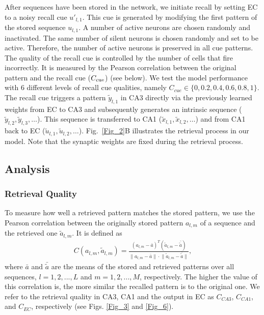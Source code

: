 \documentclass[utf8]{frontiersSCNS} %
\begin{document}
After sequences have been stored in the network, we initiate recall by setting EC to a noisy recall cue $u'_{l, 1}$. This cue is generated by modifying the first pattern of the stored sequence $u_{l, 1}$. A number of active neurons are chosen randomly and inactivated. The same number of silent neurons is chosen randomly and set to be active. 
%
Therefore, the number of active neurons is preserved in all cue patterns. 
%
The quality of the recall cue is controlled by the number of cells that fire incorrectly. It is measured by the Pearson correlation between the original pattern and the recall cue ($C_{\rm cue}$) (see below). We test the model performance with $6$ different levels of recall cue qualities, namely $ C_{cue} \in \{ 0, 0.2, 0.4, 0.6, 0.8, 1 \}$.
%
The recall cue triggers a pattern $\tilde{y}_{l, 1}$ in CA3 directly via the previously learned weights from EC to CA3 and subsequently generates an intrinsic sequence ($\tilde{y}_{l, 2}, \tilde{y}_{l, 3}, \ldots$). This sequence is transferred to CA1 ($\tilde{x}_{l, 1}, \tilde{x}_{l, 2}, \ldots$) and from CA1 back to EC ($\tilde{u}_{l, 1}, \tilde{u}_{l, 2}, \ldots$). Fig.~\ref{Fig_2}B illustrates the retrieval process in our model. Note that the synaptic weights are fixed during the retrieval process. 

\subsection{Analysis}

\subsubsection{Retrieval Quality}
To measure how well a retrieved pattern matches the stored pattern, we use the Pearson correlation between the originally stored pattern $a_{l, m}$ of a sequence and the retrieved one $\tilde{a}_{l, m}$. It is defined as
\begin{align*}
	C(a_{l, m},\tilde{a}_{l, m})  = \frac{(a_{l, m} -\bar{a})^T(\tilde{a}_{l, m} -\bar{\tilde{a}})}
{\lVert{a_{l, m} -\bar{a}} \rVert \cdot \lVert{\tilde{a}_{l, m} -\bar{\tilde{a}}}\rVert },
\end{align*}     
where $\bar{a}$ and $\bar{\tilde{a}}$ are the means of the stored and retrieved patterns over all sequences, $l = 1,2, ..., L$ and $m = 1,2, ..., M$, respectively. The higher the value of this correlation is, the more similar the recalled pattern is to the original one. We refer to the retrieval quality in CA3, CA1 and the output in EC as $C_{CA3}$, $C_{CA1}$, and $C_{EC}$, respectively (see Figs. \ref{Fig_3} and \ref{Fig_6}).
\end{document}
